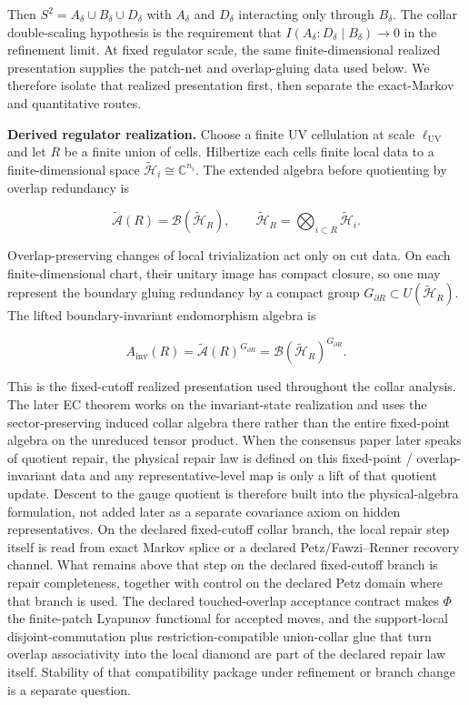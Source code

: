 Then \(S^2 = A_\delta \cup B_\delta \cup D_\delta\) with \(A_\delta\) and \(D_\delta\) interacting only through \(B_\delta\). The collar double-scaling hypothesis is the requirement that \(I(A_\delta:D_\delta \mid B_\delta) \to 0\) in the refinement limit. At fixed regulator scale, the same finite-dimensional realized presentation supplies the patch-net and overlap-gluing data used below. We therefore isolate that realized presentation first, then separate the exact-Markov and quantitative routes.

\textbf{Derived regulator realization.} Choose a finite UV cellulation at scale \(\ell_{\mathrm{UV}}\) and let \(R\) be a finite union of cells. Hilbertize each cell\textquotesingle s finite local data to a finite-dimensional space \(\tilde{\mathcal H}_i\cong \mathbb C^{n_i}\). The extended algebra before quotienting by overlap redundancy is

\[
\widetilde{\mathcal A}(R)=\mathcal B(\tilde{\mathcal H}_R),
\qquad
\tilde{\mathcal H}_R=\bigotimes_{i\subset R}\tilde{\mathcal H}_i.
\]

Overlap-preserving changes of local trivialization act only on cut data. On each finite-dimensional chart, their unitary image has compact closure, so one may represent the boundary gluing redundancy by a compact group \(G_{\partial R}\subset U(\tilde{\mathcal H}_R)\). The lifted boundary-invariant endomorphism algebra is

\[
A_{\mathrm{inv}}(R)=\widetilde{\mathcal A}(R)^{G_{\partial R}}
=\mathcal B(\tilde{\mathcal H}_R)^{G_{\partial R}}.
\]

This is the fixed-cutoff realized presentation used throughout the collar analysis. The later EC theorem works on the invariant-state realization and uses the sector-preserving induced collar algebra there rather than the entire fixed-point algebra on the unreduced tensor product.
When the consensus paper later speaks of quotient repair, the physical repair law is defined on
this fixed-point / overlap-invariant data and any representative-level map is only a lift of that
quotient update. Descent to the gauge quotient is therefore built into the physical-algebra
formulation, not added later as a separate covariance axiom on hidden representatives. On the
declared fixed-cutoff collar branch, the local repair step itself is read from exact Markov splice
or a declared Petz/Fawzi--Renner recovery channel. What remains above that step on the declared
fixed-cutoff branch is repair completeness, together with control on the declared Petz domain
where that branch is used. The declared touched-overlap acceptance contract makes \(\Phi\) the
finite-patch Lyapunov functional for accepted moves, and the support-local disjoint-commutation
plus restriction-compatible union-collar glue that turn overlap associativity into the local
diamond are part of the declared repair law itself. Stability of that compatibility package under
refinement or branch change is a separate question.

